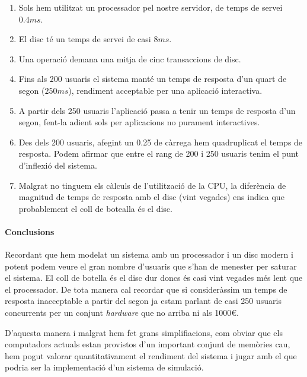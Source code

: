 \begin{enumerate}

  \item Sols hem utilitzat un processador pel nostre servidor, de temps de
    servei $0.4ms$.

  \item El disc té un temps de servei de casi $8ms$.

  \item Una operació demana una mitja de cinc transaccions de disc.

  \item Fins als 200 usuaris el sistema manté un temps de resposta d'un quart
    de segon ($250ms$), rendiment acceptable per una aplicació interactiva.

  \item A partir dels 250 usuaris l'aplicació passa a tenir un temps de
    resposta d'un segon, fent-la adient sols per aplicacions no purament
    interactives.

  \item Des dels 200 usuaris, afegint un 0.25 de càrrega hem quadruplicat el
    temps de resposta. Podem afirmar que entre el rang de 200 i 250 usuaris
    tenim el punt d'inflexió del sistema.

  \item Malgrat no tinguem els càlculs de l'utilització de la CPU, la
    diferència de magnitud de temps de resposta amb el disc (vint vegades) ens
    indica que probablement el coll de botealla és el disc.

\end{enumerate}

\paragraph{Conclusions}

Recordant que hem modelat un sistema amb un processador i un disc modern i
potent podem veure el gran nombre d'usuaris que s'han de menester per saturar
el sistema. El coll de botella és el disc dur doncs és casi vint vegades més
lent que el processador. De tota manera cal recordar que si consideràssim un
temps de resposta inacceptable a partir del segon ja estam parlant de casi 250
usuaris concurrents per un conjunt \emph{hardware} que no arriba ni als 1000€.

D'aquesta manera i malgrat hem fet grans simplifiacions, com obviar que els
computadors actuals estan provistos d'un important conjunt de memòries cau, hem
pogut valorar quantitativament el rendiment del sistema i jugar amb el que
podria ser la implementació d'un sistema de simulació.
